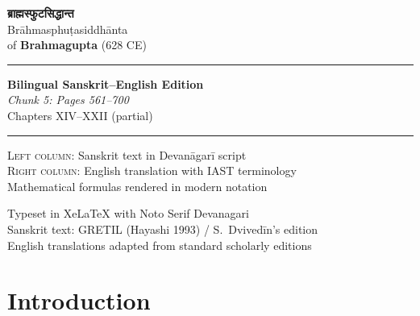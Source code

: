 \documentclass[11pt,a4paper]{article}
\newcommand{\shortline}{\noindent\rule{0.5\textwidth}{0.4pt}\par}
\newcommand{\dev}[1]{{\devanagarifont\color{sktcolor}#1}}
\begin{document}
\begin{titlepage}
\centering
\vspace*{1.5cm}

{\Huge\bfseries\color{titlecolor} \dev{ब्राह्मस्फुटसिद्धान्त}}\\[0.6cm]
{\LARGE\color{sectioncolor} Brāhmasphuṭasiddhānta}\\[0.3cm]
{\large of \textbf{Brahmagupta} (628 CE)}\\[1.2cm]

\shortline

{\Large\bfseries\color{sectioncolor} Bilingual Sanskrit–English Edition}\\[0.4cm]
{\large\color{engcolor}\textit{Chunk 5: Pages 561–700}}\\[0.3cm]
{\normalsize Chapters XIV–XXII (partial)}\\[1cm]

\shortline

\vspace{0.8cm}

{\small\textsc{Left column:} Sanskrit text in Devanāgarī script}\\[0.2cm]
{\small\textsc{Right column:} English translation with IAST terminology}\\[0.5cm]
{\footnotesize Mathematical formulas rendered in modern notation}\\[1cm]

\vfill

{\footnotesize Typeset in XeLaTeX with Noto Serif Devanagari}\\
{\footnotesize Sanskrit text: GRETIL (Hayashi 1993) / S.~Dvivedīn's edition}\\
{\footnotesize English translations adapted from standard scholarly editions}

\end{titlepage}

\tableofcontents
\newpage

\section*{Introduction}
\end{document}
